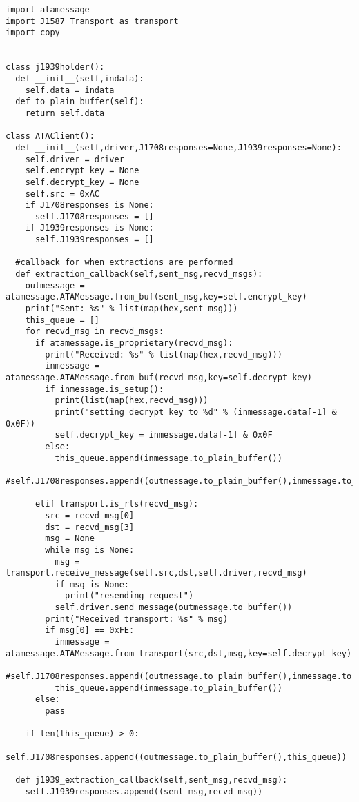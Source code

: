 \begin{appendices}
\begin{verbatim}
import atamessage
import J1587_Transport as transport
import copy


class j1939holder():
  def __init__(self,indata):
    self.data = indata
  def to_plain_buffer(self):
    return self.data

class ATAClient():
  def __init__(self,driver,J1708responses=None,J1939responses=None):
    self.driver = driver
    self.encrypt_key = None
    self.decrypt_key = None
    self.src = 0xAC
    if J1708responses is None:
      self.J1708responses = []
    if J1939responses is None:
      self.J1939responses = []

  #callback for when extractions are performed
  def extraction_callback(self,sent_msg,recvd_msgs):
    outmessage = atamessage.ATAMessage.from_buf(sent_msg,key=self.encrypt_key)
    print("Sent: %s" % list(map(hex,sent_msg)))
    this_queue = []
    for recvd_msg in recvd_msgs:
      if atamessage.is_proprietary(recvd_msg):
        print("Received: %s" % list(map(hex,recvd_msg)))
        inmessage = atamessage.ATAMessage.from_buf(recvd_msg,key=self.decrypt_key)
        if inmessage.is_setup():
          print(list(map(hex,recvd_msg)))
          print("setting decrypt key to %d" % (inmessage.data[-1] & 0x0F))
          self.decrypt_key = inmessage.data[-1] & 0x0F
        else:
          this_queue.append(inmessage.to_plain_buffer())
        #self.J1708responses.append((outmessage.to_plain_buffer(),inmessage.to_plain_buffer()))

      elif transport.is_rts(recvd_msg):
        src = recvd_msg[0]
        dst = recvd_msg[3]
        msg = None
        while msg is None:
          msg = transport.receive_message(self.src,dst,self.driver,recvd_msg)
          if msg is None:
            print("resending request")
          self.driver.send_message(outmessage.to_buffer())
        print("Received transport: %s" % msg)
        if msg[0] == 0xFE:
          inmessage = atamessage.ATAMessage.from_transport(src,dst,msg,key=self.decrypt_key)
          #self.J1708responses.append((outmessage.to_plain_buffer(),inmessage.to_plain_buffer()))
          this_queue.append(inmessage.to_plain_buffer())
      else:
        pass

    if len(this_queue) > 0:
      self.J1708responses.append((outmessage.to_plain_buffer(),this_queue))

  def j1939_extraction_callback(self,sent_msg,recvd_msg):
    self.J1939responses.append((sent_msg,recvd_msg))


\end{verbatim}



\end{appendices}
